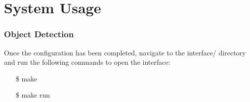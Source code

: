\chapter{System Usage}
\subsection{Object Detection}

Once the configuration has been completed, navigate to the interface/ directory and run the following commands to open the interface:
\begin{itemize}
    \item[\$] make
    \item[\$] make run
\end{itemize}